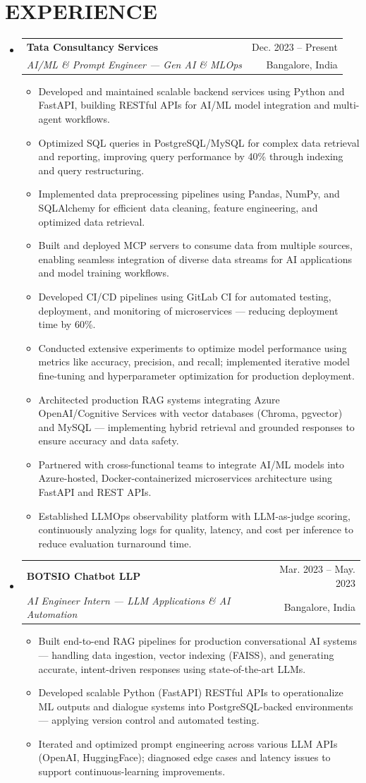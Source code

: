 \documentclass[letterpaper,10pt]{article}
\makeatletter
\newcommand{\resumeItem}[1]{
  \item\small{
    {#1 \vspace{-2pt}} 
  }
}
\newcommand{\resumeSubheading}[4]{
  \vspace{-2pt}\item 
    \begin{tabular*}{\textwidth}[t]{l@{\extracolsep{\fill}}r}
      \textbf{#1} & {\color{dark-grey}\small #2}\vspace{1pt}\\ 
      \textit{#3} & {\color{dark-grey} \small #4}\\ 
    \end{tabular*}\vspace{-6pt} 
}
\newcommand{\resumeSubHeadingListStart}{\begin{itemize}[leftmargin=0in, label={}]}
\newcommand{\resumeSubHeadingListEnd}{\end{itemize}\vspace{-6pt}}
\newcommand{\resumeItemListStart}{\begin{itemize}}
\newcommand{\resumeItemListEnd}{\end{itemize}\vspace{-4pt}}
\makeatother
\begin{document}
\section{EXPERIENCE}
  \resumeSubHeadingListStart
    \resumeSubheading
      {Tata Consultancy Services}{Dec. 2023 -- Present}
      {AI/ML \& Prompt Engineer — Gen AI \& MLOps}{Bangalore, India}
      \resumeItemListStart
        \resumeItem{Developed and maintained scalable backend services using Python and FastAPI, building RESTful APIs for AI/ML model integration and multi-agent workflows.}
        \resumeItem{Optimized SQL queries in PostgreSQL/MySQL for complex data retrieval and reporting, improving query performance by 40\% through indexing and query restructuring.}
        \resumeItem{Implemented data preprocessing pipelines using Pandas, NumPy, and SQLAlchemy for efficient data cleaning, feature engineering, and optimized data retrieval.}
        \resumeItem{Built and deployed MCP servers to consume data from multiple sources, enabling seamless integration of diverse data streams for AI applications and model training workflows.}
        \resumeItem{Developed CI/CD pipelines using GitLab CI for automated testing, deployment, and monitoring of microservices — reducing deployment time by 60\%.}
        \resumeItem{Conducted extensive experiments to optimize model performance using metrics like accuracy, precision, and recall; implemented iterative model fine-tuning and hyperparameter optimization for production deployment.}
        \resumeItem{Architected production RAG systems integrating Azure OpenAI/Cognitive Services with vector databases (Chroma, pgvector) and MySQL — implementing hybrid retrieval and grounded responses to ensure accuracy and data safety.}
        \resumeItem{Partnered with cross-functional teams to integrate AI/ML models into Azure-hosted, Docker-containerized microservices architecture using FastAPI and REST APIs.}
        \resumeItem{Established LLMOps observability platform with LLM-as-judge scoring, continuously analyzing logs for quality, latency, and cost per inference to reduce evaluation turnaround time.}
      \resumeItemListEnd
    \resumeSubheading
      {BOTSIO Chatbot LLP}{Mar. 2023 -- May. 2023}
      {AI Engineer Intern — LLM Applications \& AI Automation}{Bangalore, India}
      \resumeItemListStart
        \resumeItem{Built end-to-end RAG pipelines for production conversational AI systems — handling data ingestion, vector indexing (FAISS), and generating accurate, intent-driven responses using state-of-the-art LLMs.}
        \resumeItem{Developed scalable Python (FastAPI) RESTful APIs to operationalize ML outputs and dialogue systems into PostgreSQL-backed environments — applying version control and automated testing.}
        \resumeItem{Iterated and optimized prompt engineering across various LLM APIs (OpenAI, HuggingFace); diagnosed edge cases and latency issues to support continuous-learning improvements.}
      \resumeItemListEnd
  \resumeSubHeadingListEnd
\end{document}
